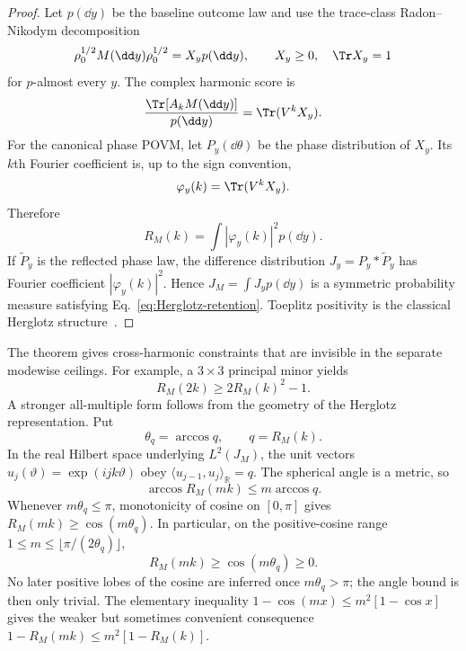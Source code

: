 \begin{proof}
Let $p(\dd y)$ be the baseline outcome law and use the trace-class Radon--Nikodym decomposition
\begin{equation}
 \rho_0^{1/2}M(\dd y)\rho_0^{1/2}=X_y p(\dd y),
 \qquad
 X_y\geq0,
 \quad
 \Tr X_y=1
 \label{eq:posterior-Herglotz}
\end{equation}
for $p$-almost every $y$.  The complex harmonic score is
\begin{equation}
 \frac{\Tr[A_kM(\dd y)]}{p(\dd y)}
 =\Tr(V^kX_y).
\end{equation}
For the canonical phase POVM, let $P_y(\dd\theta)$ be the phase distribution of $X_y$.  Its $k$th Fourier coefficient is, up to the sign convention,
\begin{equation}
 \varphi_y(k)=\Tr(V^kX_y).
\end{equation}
Therefore
\begin{equation}
 R_M(k)=\int |\varphi_y(k)|^2p(\dd y).
 \label{eq:retention-posterior-phase}
\end{equation}
If $\widetilde P_y$ is the reflected phase law, the difference distribution $J_y=P_y*\widetilde P_y$ has Fourier coefficient $|\varphi_y(k)|^2$.  Hence
$J_M=\int J_y p(\dd y)$ is a symmetric probability measure satisfying Eq.~\eqref{eq:Herglotz-retention}.  Toeplitz positivity is the classical Herglotz structure~\cite{BhattacharyaWaymire2016}.
\end{proof}

The theorem gives cross-harmonic constraints that are invisible in the separate modewise ceilings.  For example, a $3\times3$ principal minor yields
\begin{equation}
 R_M(2k)\geq2R_M(k)^2-1.
 \label{eq:twoharmonic-Toeplitz}
\end{equation}
A stronger all-multiple form follows from the geometry of the Herglotz representation.  Put
\begin{equation}
 \theta_q=\arccos q,
 \qquad q=R_M(k).
\end{equation}
In the real Hilbert space underlying $L^2(J_M)$, the unit vectors
$u_j(\vartheta)=\exp(ijk\vartheta)$ obey
$\langle u_{j-1},u_j\rangle_{\mathbb R}=q$.  The spherical angle is a metric, so
\begin{equation}
 \arccos R_M(mk)\leq m\arccos q.
 \label{eq:spherical-angle}
\end{equation}
Whenever $m\theta_q\leq\pi$, monotonicity of cosine on $[0,\pi]$ gives
$R_M(mk)\geq\cos(m\theta_q)$.  In particular, on the positive-cosine range
$1\leq m\leq\lfloor\pi/(2\theta_q)\rfloor$,
\begin{equation}
 R_M(mk)\geq\cos(m\theta_q)\geq0.
 \label{eq:angle-propagation}
\end{equation}
No later positive lobes of the cosine are inferred once $m\theta_q>\pi$; the angle bound is then only trivial.  The elementary inequality $1-\cos(mx)\leq m^2[1-\cos x]$ gives the weaker but sometimes convenient consequence
$1-R_M(mk)\leq m^2[1-R_M(k)]$.

